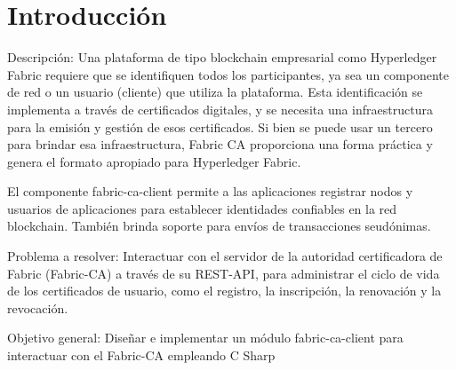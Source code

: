 \chapter*{Introducción}\label{chapter:introduction}

Descripción: Una plataforma de tipo blockchain empresarial como Hyperledger Fabric requiere que se identifiquen todos los participantes, ya sea un componente de red o un usuario (cliente) que utiliza la plataforma. Esta identificación se implementa a través de certificados digitales, y se necesita una infraestructura para la emisión y gestión de esos certificados.
Si bien se puede usar un tercero para brindar esa infraestructura, Fabric CA proporciona una forma práctica y genera el formato apropiado para Hyperledger Fabric.

El componente fabric-ca-client permite a las aplicaciones registrar nodos y usuarios de aplicaciones para establecer identidades confiables en la red blockchain. También brinda soporte para envíos de transacciones seudónimas.

Problema a resolver: Interactuar con el servidor de la autoridad certificadora de Fabric (Fabric-CA) a través de su REST-API, para administrar el ciclo de vida de los certificados de usuario, como el registro, la inscripción, la renovación y la revocación.

Objetivo general: Dise\~nar e implementar un módulo fabric-ca-client para interactuar con el Fabric-CA empleando C Sharp


